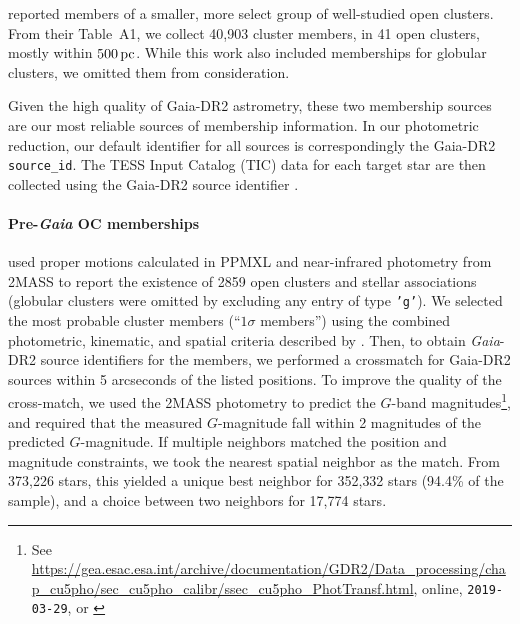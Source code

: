 \documentclass[12pt,twocolumn,tighten]{aastex62}
\begin{document}
\citet{gaia_hr_2018} reported members of a smaller, more
select group of well-studied open clusters. From their Table~A1, we
collect 40{,}903 cluster members, in 41 open clusters, mostly within
$500\,{\rm pc}$. While this work also included memberships for
globular clusters, we omitted them from consideration.

Given the high quality of Gaia-DR2 astrometry, these two
membership sources are our most reliable sources of membership
information.  In our photometric reduction,  our default identifier
for all sources is correspondingly the Gaia-DR2 \texttt{source\_id}.
The TESS Input Catalog (TIC) data for each target star are then collected
using the Gaia-DR2 source identifier \citep{stassun_TIC_2018,stassun_TIC8_2019}.  




\paragraph{Pre-{\it Gaia} OC memberships}
\citet{Kharchenko_et_al_2013} used proper motions calculated in PPMXL
\citep[][a combination of USNO-B1{.}0 and 2MASS
astrometry]{roeser_ppmxl_2010} and near-infrared photometry from 2MASS
\citep{skrutskie_tmass_2006} to report the existence of 2859 open
clusters and stellar associations (globular clusters were omitted by
excluding any entry of type \texttt{'g'}).  We selected the most
probable cluster members (``$1\sigma$ members'') using the combined
photometric, kinematic, and spatial criteria described by
\citet[][Section~3.3]{kharchenko_global_2012}.  Then, to obtain {\it
Gaia}-DR2 source identifiers for the members, we performed a
crossmatch for Gaia-DR2 sources within 5 arcseconds of the
listed positions.  To improve the quality of the cross-match, we
used the 2MASS photometry to predict the $G$-band
magnitudes\footnote{See
\url{https://gea.esac.esa.int/archive/documentation/GDR2/Data_processing/chap_cu5pho/sec_cu5pho_calibr/ssec_cu5pho_PhotTransf.html},
online, \texttt{2019-03-29}, or \citet{carrasco_gaia_2016}}, and
required that the measured $G$-magnitude fall within 2 magnitudes of
the predicted $G$-magnitude.  If multiple neighbors matched the
position and magnitude constraints, we took the nearest spatial
neighbor as the match.  From 373{,}226 stars, this yielded a unique
best neighbor for 352{,}332 stars (94.4\% of the sample), and a choice
between two neighbors for 17{,}774 stars. 
\end{document}
